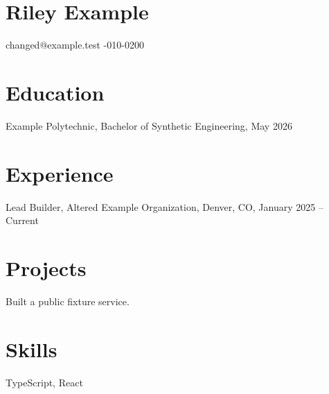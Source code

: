 \documentclass{article}
\begin{document}
\section*{Riley Example}
changed@example.test -010-0200
\section*{Education}
Example Polytechnic, Bachelor of Synthetic Engineering, May 2026
\section*{Experience}
Lead Builder, Altered Example Organization, Denver, CO, January 2025 -- Current
\section*{Projects}
Built a public fixture service.
\section*{Skills}
TypeScript, React
\end{document}
